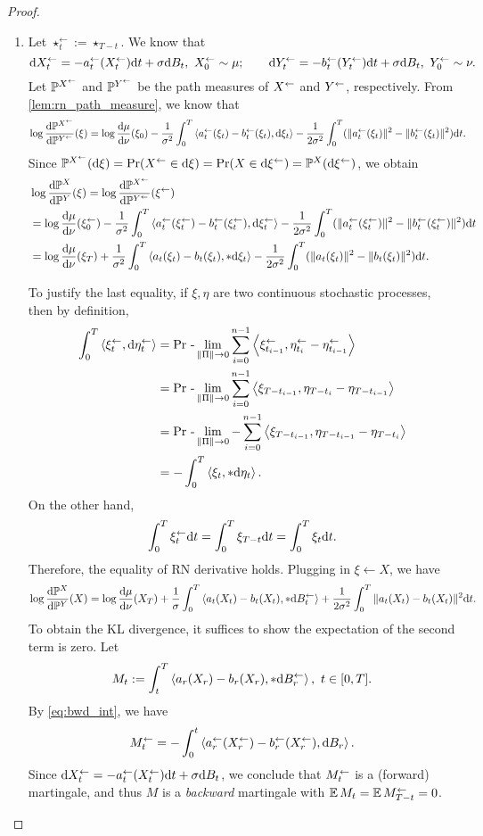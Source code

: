 \begin{proof}
\begin{enumerate}[wide=0pt,itemsep=0pt, topsep=0pt,parsep=0pt,partopsep=0pt]
\item Let $\star^\gets_t:=\star_{T-t}$. We know that
$$\mathrm{d}X^\gets_t =-a^\gets_t(X^\gets_t)\mathrm{d} t+\sigma\mathrm{d} B_t,~X^\gets_0\sim\mu;\qquad\mathrm{d}Y^\gets_t =-b^\gets_t(Y^\gets_t)\mathrm{d} t+\sigma\mathrm{d} B_t,~Y^\gets_0\sim\nu.$$
Let $\mathbb{P}^{X^\gets}$ and $\mathbb{P}^{Y^\gets}$ be the path measures of $X^\gets$ and $Y^\gets$, respectively. From \cref{lem:rn_path_measure}, we know that
\begin{align*}
    \log\frac{\mathrm{d}\mathbb{P}^{X^\gets}}{\mathrm{d}\mathbb{P}^{Y^\gets}}(\xi) & =\log\frac{\mathrm{d}\mu}{\mathrm{d}\nu}(\xi_0)-\frac{1}{\sigma^2}\int_0^T\left\langle a^\gets_t(\xi_t)-b^\gets_t(\xi_t),\mathrm{d}\xi_t\right\rangle-\frac{1}{2\sigma^2}\int_0^T(\|a^\gets_t(\xi_t)\|^2-\|b^\gets_t(\xi_t)\|^2)\mathrm{d} t.
\end{align*}
Since $\mathbb{P}^{X^\gets}(\mathrm{d}\xi)=\operatorname{Pr}(X^\gets\in\mathrm{d}\xi)=\operatorname{Pr}(X\in\mathrm{d}\xi^\gets)=\mathbb{P}^X(\mathrm{d}\xi^\gets)$, we obtain
\begin{align*}
    &\log\frac{\mathrm{d}\mathbb{P}^X}{\mathrm{d}\mathbb{P}^Y}(\xi) =\log\frac{\mathrm{d}\mathbb{P}^{X^\gets}}{\mathrm{d}\mathbb{P}^{Y^\gets}}(\xi^\gets)\\
    &=\log\frac{\mathrm{d}\mu}{\mathrm{d}\nu}(\xi^\gets_0)-\frac{1}{\sigma^2}\int_0^T\left\langle a^\gets_t(\xi^\gets_t)-b^\gets_t(\xi^\gets_t),\mathrm{d}\xi^\gets_t\right\rangle-\frac{1}{2\sigma^2}\int_0^T(\|a^\gets_t(\xi^\gets_t)\|^2-\|b^\gets_t(\xi^\gets_t)\|^2)\mathrm{d} t\\
    &=\log\frac{\mathrm{d}\mu}{\mathrm{d}\nu}(\xi_T)+\frac{1}{\sigma^2}\int_0^T\left\langle a_t(\xi_t)-b_t(\xi_t),*\mathrm{d}\xi_t\right\rangle-\frac{1}{2\sigma^2}\int_0^T(\|a_t(\xi_t)\|^2-\|b_t(\xi_t)\|^2)\mathrm{d} t.
\end{align*}

To justify the last equality, if $\xi,\eta$ are two continuous stochastic processes, then by definition,
\begin{align}
    \int_0^T\left\langle\xi^\gets_t,\mathrm{d}\eta^\gets_t\right\rangle&=\operatorname{Pr}\,{\text-}\lim_{\|\Pi\|\to0}\sum_{i=0}^{n-1}\left\langle\xi^\gets_{t_{i-1}},\eta^\gets_{t_i}-\eta^\gets_{t_{i-1}}\right\rangle\nonumber\\
    &=\operatorname{Pr}\,{\text-}\lim_{\|\Pi\|\to0}\sum_{i=0}^{n-1}\left\langle\xi_{T-t_{i-1}},\eta_{T-t_i}-\eta_{T-t_{i-1}}\right\rangle\nonumber\\  
    &=\operatorname{Pr}\,{\text-}\lim_{\|\Pi\|\to0}-\sum_{i=0}^{n-1}\left\langle\xi_{T-t_{i-1}},\eta_{T-t_{i-1}}-\eta_{T-t_i}\right\rangle\nonumber\\  
    &=-\int_0^T\left\langle\xi_t,*\mathrm{d}\eta_t\right\rangle.\label{eq:bwd_int}
\end{align}
On the other hand, 
$$\int_0^T\xi^\gets_t\mathrm{d} t=\int_0^T\xi_{T-t}\mathrm{d} t=\int_0^T\xi_t\mathrm{d} t.$$
Therefore, the equality of RN derivative holds. Plugging in $\xi\gets X$, we have
$$\log\frac{\mathrm{d}\mathbb{P}^X}{\mathrm{d}\mathbb{P}^Y}(X) =\log\frac{\mathrm{d}\mu}{\mathrm{d}\nu}(X_T)+\frac{1}{\sigma}\int_0^T\left\langle a_t(X_t)-b_t(X_t),*\mathrm{d}B^\gets_t\right\rangle+\frac{1}{2\sigma^2}\int_0^T\|a_t(X_t)-b_t(X_t)\|^2\mathrm{d} t.$$
To obtain the KL divergence, it suffices to show the expectation of the second term is zero. Let 
$$M_t:=\int_t^T\left\langle a_r(X_r)-b_r(X_r),*\mathrm{d}B^\gets_r\right\rangle,~t\in[0,T].$$
By \cref{eq:bwd_int}, we have 
$$M^\gets_t=-\int_0^t\left\langle a^\gets_r(X^\gets_r)-b^\gets_r(X^\gets_r),\mathrm{d} B_r\right\rangle.$$
Since $\mathrm{d}X^\gets_t =-a^\gets_t(X^\gets_t)\mathrm{d} t+\sigma\mathrm{d} B_t$, we conclude that $M^\gets_t$ is a (forward) martingale, and thus $M$ is a \emph{backward} martingale with $\operatorname{\mathbb{E}} M_t=\operatorname{\mathbb{E}}M^\gets_{T-t}=0$.


\end{enumerate}
\end{proof}
